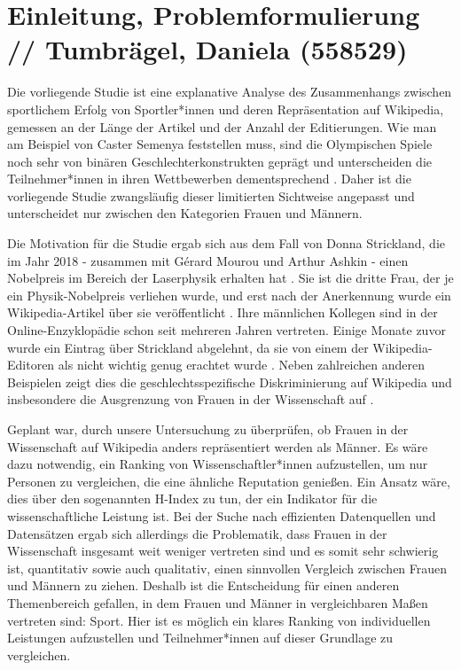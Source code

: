 \documentclass[11pt]{article}
\begin{document}
\section {Einleitung, Problemformulierung // Tumbrägel, Daniela (558529)}

Die vorliegende Studie ist eine explanative Analyse des Zusammenhangs zwischen sportlichem Erfolg von Sportler*innen und deren Repräsentation auf Wikipedia, gemessen an der Länge der Artikel und der Anzahl der Editierungen. Wie man am Beispiel von Caster Semenya feststellen muss, sind die Olympischen Spiele noch sehr von binären Geschlechterkonstrukten geprägt und unterscheiden die Teilnehmer*innen in ihren Wettbewerben dementsprechend \parencite{IOCRules}. Daher ist die vorliegende Studie zwangsläufig dieser limitierten Sichtweise angepasst und unterscheidet nur zwischen den Kategorien Frauen und Männern.

Die Motivation für die Studie ergab sich aus dem Fall von Donna Strickland, die im Jahr 2018 - zusammen mit Gérard Mourou und Arthur Ashkin - einen Nobelpreis im Bereich der Laserphysik erhalten hat \parencite{nobelprize}. Sie ist die dritte Frau, der je ein Physik-Nobelpreis verliehen wurde, und erst nach der Anerkennung wurde ein Wikipedia-Artikel über sie veröffentlicht \parencite{Bazely2018}. Ihre männlichen Kollegen sind in der Online-Enzyklopädie schon seit mehreren Jahren vertreten. Einige Monate zuvor wurde ein Eintrag über Strickland abgelehnt, da sie von einem der Wikipedia-Editoren als nicht wichtig genug erachtet wurde \parencite{stricklandWiki}. Neben zahlreichen anderen Beispielen zeigt dies die geschlechtsspezifische Diskriminierung auf Wikipedia und insbesondere die Ausgrenzung von Frauen in der Wissenschaft auf \parencite{LeylandCecco}.

Geplant war, durch unsere Untersuchung zu überprüfen, ob Frauen in der Wissenschaft auf Wikipedia anders repräsentiert werden als Männer. Es wäre dazu notwendig, ein Ranking von Wissenschaftler*innen aufzustellen, um nur Personen zu vergleichen, die eine ähnliche Reputation genießen. Ein Ansatz wäre, dies über den sogenannten H-Index zu tun, der ein Indikator für die wissenschaftliche Leistung ist\parencite{hIndex}. Bei der Suche nach effizienten Datenquellen und Datensätzen ergab sich allerdings die Problematik, dass Frauen in der Wissenschaft insgesamt weit weniger vertreten sind und es somit sehr schwierig ist, quantitativ sowie auch qualitativ, einen sinnvollen Vergleich zwischen Frauen und Männern zu ziehen. Deshalb ist die Entscheidung für einen anderen Themenbereich gefallen, in dem Frauen und Männer in vergleichbaren Maßen vertreten sind: Sport. Hier ist es möglich ein klares Ranking von individuellen Leistungen aufzustellen und Teilnehmer*innen auf dieser Grundlage zu vergleichen.
\end{document}
